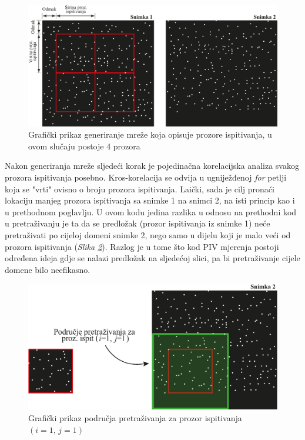 \begin{figure}[h]  
	\centering
	\includegraphics[width=13.5cm]{./6_PrimjerKrosKorelacije/slika6_3.pdf} 
	\caption{Grafički prikaz generiranje mreže koja opisuje prozore ispitivanja, u ovom slučaju postoje 4 prozora}
	\label{sl:6.3}
\end{figure}
\par
Nakon generiranja mreže sljedeći korak je pojedinačna korelacijska analiza svakog prozora ispitivanja posebno. Kros-korelacija se odvija u ugniježđenoj \textit{for} petlji koja se "vrti" ovisno o broju prozora ispitivanja. Laički, sada je cilj pronaći lokaciju manjeg prozora ispitivanja sa snimke 1 na snimci 2, na isti princip kao i u prethodnom poglavlju. U ovom kodu jedina razlika u odnosu na prethodni kod u pretraživanju je ta da se predložak (prozor ispitivanja iz snimke 1) neće pretraživati po cijeloj domeni snimke 2, nego samo u dijelu koji je malo veći od prozora ispitivanja (\textit{Slika \ref{sl:6.4}}). Razlog je u tome što kod PIV mjerenja postoji određena ideja gdje se nalazi predložak na sljedećoj slici, pa bi pretraživanje cijele domene bilo neefikasno. 
\begin{figure}[h]  
	\centering
	\includegraphics[width=13cm]{./6_PrimjerKrosKorelacije/slika6_4.pdf} 
	\caption{Grafički prikaz područja pretraživanja za prozor ispitivanja $(i=1,\, j=1)$}
	\label{sl:6.4}
\end{figure}
